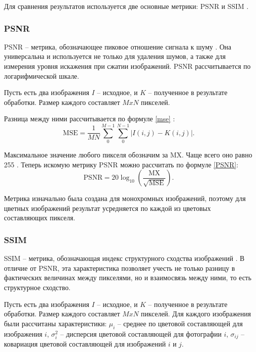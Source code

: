 Для сравнения результатов используется две основные метрики: PSNR и SSIM \cite{vs}.

\subsubsection{PSNR}
PSNR -- метрика, обозначающее пиковое отношение сигнала к шуму \cite{rs}.
Она универсальна и используется не только для удаления шумов, а также для измерения уровня искажения при сжатии изображений.
PSNR рассчитывается по логарифмической шкале.

Пусть есть два изображения $I$ -- исходное, и $K$ -- полученное в результате обработки.
Размер каждого составляет $MxN$ пикселей.

Разница между ними рассчитывается по формуле \eqref{mse} \cite{rs}:
\begin{equation}
	\label{mse}
	\mathrm{MSE} = \frac{1}{MN}\sum_{0}^{M-1}\sum_{0}^{N-1}|I(i, j) - K(i, j)|.
\end{equation}

Максимальное значение любого пикселя обозначим за MX. 
Чаще всего оно равно 255 \cite{rs}.
Теперь искомую метрику PSNR можно рассчитать по формуле \eqref{PSNR}:
\begin{equation}
	\label{PSNR}
	\mathrm{PSNR} = 20\log_{10}\left(\frac{\mathrm{MX}}{\sqrt{\mathrm{MSE}}}\right).
\end{equation}

Метрика изначально была создана для монохромных изображений, поэтому для цветных изображений результат усредняется по каждой из цветовых составляющих пикселя.

\subsubsection{SSIM}
SSIM -- метрика, обозначающая индекс структурного сходства изображений \cite{ssim}. 
В отличие от PSNR, эта характеристика позволяет учесть не только разницу в фактических величинах между пикселями, но и взаимосвязь между ними, то есть структурное сходство.

Пусть есть два изображения $I$ -- исходное, и $K$ -- полученное в результате обработки.
Размер каждого составляет $MxN$ пикселей. 
Для каждого изображения были рассчитаны характеристики: $\mu_{i}$ -- среднее по цветовой составляющей для изображения $i$, $\sigma^2_i$ -- дисперсия цветовой составляющей для фотографии $i$, $\sigma_{ij}$ -- ковариация цветовой составляющей для изображений $i$ и $j$. 

